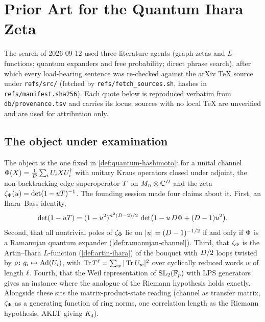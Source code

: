 
\section{Prior Art for the Quantum Ihara Zeta}
\label{sec:prior-art}

The search of 2026-09-12 used three literature agents (graph zetas and
$L$-functions; quantum expanders and free probability; direct phrase search),
after which every load-bearing sentence was re-checked against the arXiv
\TeX{} source under \texttt{refs/src/} (fetched by
\texttt{refs/fetch\_sources.sh}, hashes in \texttt{refs/manifest.sha256}).
Each quote below is reproduced verbatim from \texttt{db/provenance.tsv} and
carries its locus; sources with no local \TeX{} are unverified and are used
for attribution only.

\subsection{The object under examination}

The object is the one fixed in \cref{def:quantum-hashimoto}: for a unital
channel $\Phi(X) = \frac1{D}\sum_i U_{i}XU_{i}^\dagger$ with unitary
Kraus operators closed under adjoint, the non-backtracking edge superoperator
$T$ on $M_n\otimes\mathbb C^{D}$ and the zeta
$\zeta_{\Phi}(u) = \det(1-uT)^{-1}$. The founding session made four claims
about it. First, an Ihara--Bass identity,
\begin{equation}
\label{eq:prior-art-ihara-bass}
\det(1-uT) = (1-u^2)^{n^2(D-2)/2}\,
 \det\bigl(1 - u\,D\Phi + (D-1)u^2\bigr).
\end{equation}
Second, that all nontrivial poles of $\zeta_{\Phi}$ lie on $|u| = (D-1)^{-1/2}$
if and only if $\Phi$ is a Ramanujan quantum expander
(\cref{def:ramanujan-channel}). Third, that $\zeta_{\Phi}$ is the Artin--Ihara
$L$-function (\cref{def:artin-ihara}) of the bouquet with $D/2$ loops
twisted by $\varrho\colon g_i\mapsto \operatorname{Ad}(U_{i})$, with
$\operatorname{Tr}T^{\ell} = \sum_w |\operatorname{Tr} U_{w}|^2$ over cyclically reduced words $w$ of
length $\ell$. Fourth, that the Weil representation of $\mathrm{SL}_2(\mathbb F_p)$ with LPS
generators gives an instance where the analogue of the Riemann hypothesis holds
exactly. Alongside these sits the matrix-product-state reading (channel as
transfer matrix, $\zeta_{\Phi}$ as a generating function of ring norms, one
correlation length as the Riemann hypothesis, AKLT giving $K_4$).

